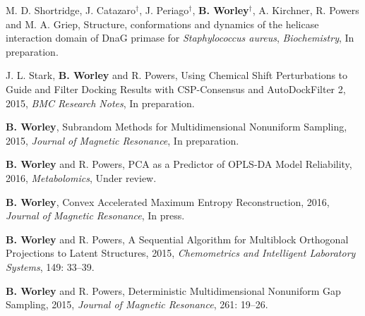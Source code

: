 \documentclass[letterpaper]{article}
\renewenvironment{itemize}{
  \begin{list}{}{
    \setlength{\leftmargin}{1.5em}
  }
}{
  \end{list}
}
\begin{document}
\begin{itemize}
\item M. D. Shortridge, J. Catazaro$^\dagger$, J. Periago$^\dagger$,
 \textbf{B. Worley}$^\dagger$, A. Kirchner, R. Powers and M. A. Griep,
 Structure, conformations and dynamics of the helicase interaction
 domain of DnaG primase for {\it Staphylococcus aureus},
 {\it Biochemistry}, In preparation.
\end{itemize}

\begin{itemize}
\item J. L. Stark, \textbf{B. Worley} and R. Powers,
 Using Chemical Shift Perturbations to Guide and Filter Docking Results
 with CSP-Consensus and AutoDockFilter 2, 2015,
 {\it BMC Research Notes}, In preparation.
\end{itemize}

\begin{itemize}
\item \textbf{B. Worley},
 Subrandom Methods for Multidimensional Nonuniform Sampling, 2015,
 {\it Journal of Magnetic Resonance}, In preparation.
\end{itemize}

\begin{itemize}
\item \textbf{B. Worley} and R. Powers,
 PCA as a Predictor of OPLS-DA Model Reliability, 2016,
 {\it Metabolomics}, Under review.
\end{itemize}

\begin{itemize}
\item \textbf{B. Worley},
 Convex Accelerated Maximum Entropy Reconstruction, 2016,
 {\it Journal of Magnetic Resonance}, In press.
\end{itemize}

\begin{itemize}
\item \textbf{B. Worley} and R. Powers,
 A Sequential Algorithm for Multiblock Orthogonal
 Projections to Latent Structures, 2015,
 {\it Chemometrics and Intelligent Laboratory Systems}, 149: 33--39.
\end{itemize}

\begin{itemize}
\item \textbf{B. Worley} and R. Powers,
 Deterministic Multidimensional Nonuniform Gap Sampling, 2015,
 {\it Journal of Magnetic Resonance}, 261: 19--26.
\end{itemize}
\end{document}
